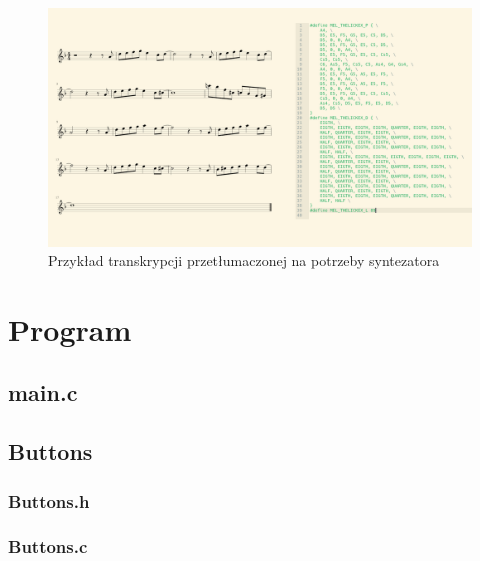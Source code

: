 \documentclass[fleqn]{article}
\begin{document}
\begin{figure}[H]
	\centering
	\includegraphics[width=\textwidth]{assets/synthdata.png}
	\caption{Przykład transkrypcji przetłumaczonej na potrzeby syntezatora}
\end{figure}

\pagebreak

\section{Program}
\subsection{main.c}

\noindent\begin{minipage}[t]{.45\textwidth}
	
\end{minipage}\hfill
\noindent\begin{minipage}[t]{.45\textwidth}
	
\end{minipage}\hfill

\noindent\begin{minipage}[t]{.45\textwidth}
	
\end{minipage}\hfill
\noindent\begin{minipage}[t]{.45\textwidth}
	
	\subsection{Buttons}
	\subsubsection{Buttons.h}
	
	\subsubsection{Buttons.c}
	
\end{minipage}\hfill
\end{document}
